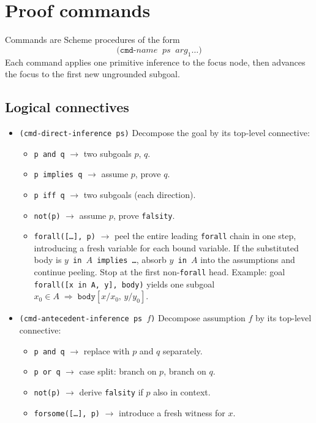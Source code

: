 \section{Proof commands}
\label{sec:commands}

Commands are Scheme procedures of the form
\[
  \texttt{(cmd-}\mathit{name}\;\; \mathit{ps}\;\; \mathit{arg}_1 \ldots\texttt{)}
\]
Each command applies one primitive inference to the focus node, then
advances the focus to the first new ungrounded subgoal.

\subsection{Logical connectives}

\begin{itemize}

\item \texttt{(cmd-direct-inference ps)}
  Decompose the goal by its top-level connective:
  \begin{itemize}
  \item \texttt{p and q} $\to$ two subgoals $p$, $q$.
  \item \texttt{p implies q} $\to$ assume $p$, prove $q$.
  \item \texttt{p iff q} $\to$ two subgoals (each direction).
  \item \texttt{not(p)} $\to$ assume $p$, prove \texttt{falsity}.
  \item \texttt{forall([\ldots], p)} $\to$ peel the entire leading
    \texttt{forall} chain in one step, introducing a fresh variable for
    each bound variable.  If the substituted body is
    \texttt{$y$ in $A$ implies \ldots}, absorb \texttt{$y$ in $A$} into
    the assumptions and continue peeling.  Stop at the first
    non-\texttt{forall} head.
    Example: goal \texttt{forall([x in A, y], body)} yields one subgoal
    $x_0 \in A \;\Longrightarrow\; \texttt{body}[x/x_0,\,y/y_0]$.
  \end{itemize}

\item \texttt{(cmd-antecedent-inference ps $f$)}
  Decompose assumption $f$ by its top-level connective:
  \begin{itemize}
  \item \texttt{p and q} $\to$ replace with $p$ and $q$ separately.
  \item \texttt{p or q} $\to$ case split: branch on $p$, branch on $q$.
  \item \texttt{not(p)} $\to$ derive \texttt{falsity} if $p$ also in context.
  \item \texttt{forsome([\ldots], p)} $\to$ introduce a fresh witness for $x$.
  \end{itemize}


\end{itemize}
